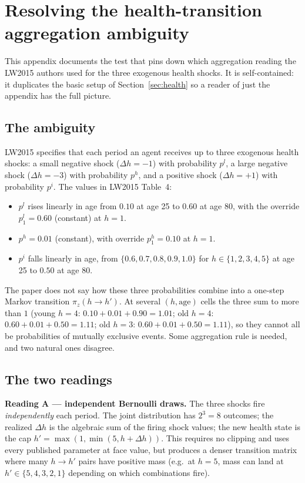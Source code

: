 \section{Resolving the health-transition aggregation ambiguity}\label{app:health-test}

This appendix documents the test that pins down which aggregation reading the LW2015 authors used for the three exogenous health shocks. It is self-contained: it duplicates the basic setup of Section~\ref{sec:health} so a reader of just the appendix has the full picture.

\subsection*{The ambiguity}

LW2015 specifies that each period an agent receives up to three exogenous health shocks: a small negative shock ($\Delta h = -1$) with probability $p^l$, a large negative shock ($\Delta h = -3$) with probability $p^h$, and a positive shock ($\Delta h = +1$) with probability $p^i$. The values in LW2015 Table~4:
\begin{itemize}
 \item $p^l$ rises linearly in age from $0.10$ at age 25 to $0.60$ at age 80, with the override $p^l_1 = 0.60$ (constant) at $h=1$.
 \item $p^h = 0.01$ (constant), with override $p^h_1 = 0.10$ at $h=1$.
 \item $p^i$ falls linearly in age, from $\{0.6, 0.7, 0.8, 0.9, 1.0\}$ for $h \in \{1, 2, 3, 4, 5\}$ at age 25 to $0.50$ at age 80.
\end{itemize}

The paper does not say how these three probabilities combine into a one-step Markov transition $\pi_z(h \to h')$. At several $(h, \text{age})$ cells the three sum to more than $1$ (young $h=4$: $0.10 + 0.01 + 0.90 = 1.01$; old $h=4$: $0.60 + 0.01 + 0.50 = 1.11$; old $h=3$: $0.60 + 0.01 + 0.50 = 1.11$), so they cannot all be probabilities of mutually exclusive events. Some aggregation rule is needed, and two natural ones disagree.

\subsection*{The two readings}

\textbf{Reading A --- independent Bernoulli draws.} The three shocks fire \emph{independently} each period. The joint distribution has $2^3 = 8$ outcomes; the realized $\Delta h$ is the algebraic sum of the firing shock values; the new health state is the cap $h' = \max(1, \min(5, h + \Delta h))$. This requires no clipping and uses every published parameter at face value, but produces a denser transition matrix where many $h \to h'$ pairs have positive mass (e.g.\ at $h=5$, mass can land at $h' \in \{5, 4, 3, 2, 1\}$ depending on which combinations fire).

